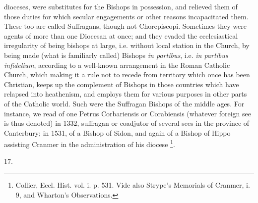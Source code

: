 dioceses, were substitutes for the Bishops in possession, and relieved
them of those duties for which secular engagements or other reasons
incapacitated them. These too are called Suffragans, though not
Chorepiscopi. Sometimes they were agents of more than one
Diocesan at once; and they evaded the ecclesiastical irregularity of
being bishops at large, i.e. without local station in the Church, by
being made (what is familiarly called) Bishops \emph{in partibus},
i.e. \emph{in partibus infidelium}, according to a well-known
arrangement in the Roman Catholic Church, which making it a rule not
to recede from territory which once has been Christian, keeps up the
complement of Bishops in those countries which have relapsed into
heathenism, and employs them for various purposes in other parts of
the Catholic world. Such were the Suffragan Bishops of the middle
ages. For instance, we read of one Petrus Corbariensis or Corabiensis
(whatever foreign see is thus denoted) in 1332, suffragan or coadjutor
of several sees in the province of Canterbury; in 1531, of a Bishop of
Sidon, and again of a Bishop of Hippo assisting Cranmer in the
administration of his diocese \footnote{Collier, Eccl. Hist. vol. i. p. 531. Vide also Strype's Memorials of
Cranmer, i. 9, and Wharton's Observations.}.

17.

